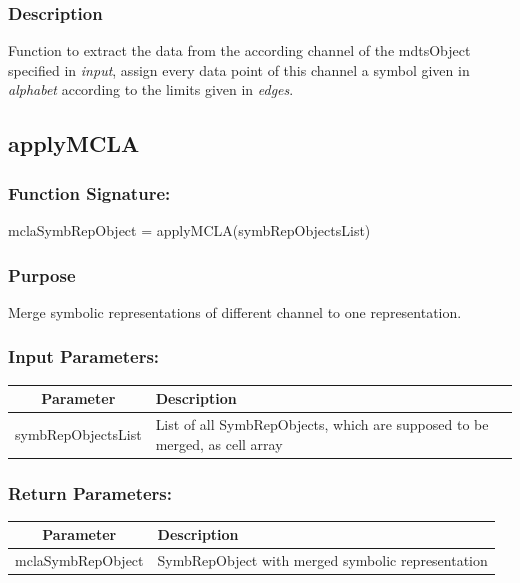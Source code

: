 \documentclass[a4]{scrreprt}
\begin{document}
\subsubsection{Description}

Function to extract the data from the according channel of the mdtsObject specified in \textit{input}, assign every data point of this channel a symbol given in \textit{alphabet} according to the limits given in \textit{edges}.

\subsection{applyMCLA}

\subsubsection{Function Signature:}

\begin{center}
	mclaSymbRepObject = applyMCLA(symbRepObjectsList)
\end{center}

\subsubsection{Purpose}

Merge symbolic representations of different channel to one representation.

\subsubsection{Input Parameters:}

\begin{longtabu} to \textwidth {|c|X|}
	\hline
	\textbf{Parameter} & \textbf{Description} \\ \hline
	\endhead
	symbRepObjectsList & List of all SymbRepObjects, which are supposed to be merged, as cell array \\ \hline
\end{longtabu}

\subsubsection{Return Parameters:}

\begin{longtabu} to \textwidth {|c|X|}
	\hline
	\textbf{Parameter} & \textbf{Description} \\ \hline
	\endhead
	mclaSymbRepObject  &  SymbRepObject with merged symbolic representation \\ \hline
\end{longtabu}
\end{document}
